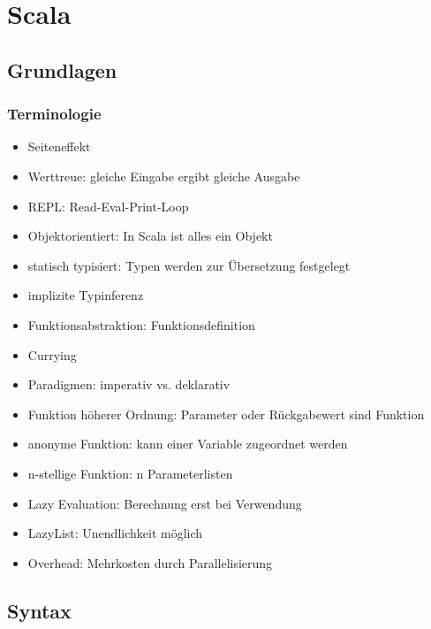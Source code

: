\section{Scala}
\subsection{Grundlagen}
\subsubsection{Terminologie}
\begin{itemize}
	\item Seiteneffekt
	\item Werttreue: gleiche Eingabe ergibt gleiche Ausgabe
	\item REPL: Read-Eval-Print-Loop
	\item Objektorientiert: In Scala ist alles ein Objekt
	\item statisch typisiert: Typen werden zur Übersetzung festgelegt
	\item implizite Typinferenz
	\item Funktionsabstraktion: Funktionsdefinition
	\item Currying
	\item Paradigmen: imperativ vs. deklarativ
	\item Funktion höherer Ordnung: Parameter oder Rückgabewert sind Funktion
	\item anonyme Funktion: kann einer Variable zugeordnet werden
	\item n-stellige Funktion: n Parameterlisten
	\item Lazy Evaluation: Berechnung erst bei Verwendung
	\item LazyList: Unendlichkeit möglich
	\item Overhead: Mehrkosten durch Parallelisierung
\end{itemize}
\subsection{Syntax}

